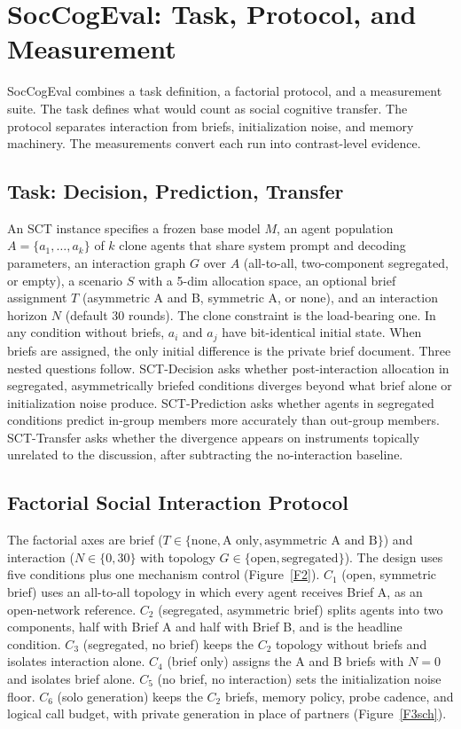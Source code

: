 \section{SocCogEval: Task, Protocol, and Measurement}\label{sec:method}\label{sec:task}

SocCogEval combines a task definition, a factorial protocol, and a measurement suite. The task defines what would count as social cognitive transfer. The protocol separates interaction from briefs, initialization noise, and memory machinery. The measurements convert each run into contrast-level evidence.

\subsection{Task: Decision, Prediction, Transfer}\label{sec:sct-task}

An SCT instance specifies a frozen base model $M$, an agent population $A{=}\{a_1, \dots, a_k\}$ of $k$ clone agents that share system prompt and decoding parameters, an interaction graph $G$ over $A$ (all-to-all, two-component segregated, or empty), a scenario $S$ with a 5-dim allocation space, an optional brief assignment $T$ (asymmetric A and B, symmetric A, or none), and an interaction horizon $N$ (default 30 rounds). The clone constraint is the load-bearing one. In any condition without briefs, $a_i$ and $a_j$ have bit-identical initial state. When briefs are assigned, the only initial difference is the private brief document. Three nested questions follow. SCT-Decision asks whether post-interaction allocation in segregated, asymmetrically briefed conditions diverges beyond what brief alone or initialization noise produce. SCT-Prediction asks whether agents in segregated conditions predict in-group members more accurately than out-group members. SCT-Transfer asks whether the divergence appears on instruments topically unrelated to the discussion, after subtracting the no-interaction baseline.

\subsection{Factorial Social Interaction Protocol}\label{sec:fsip}

The factorial axes are brief ($T \in \{\text{none}, \text{A only}, \text{asymmetric A and B}\}$) and interaction ($N \in \{0, 30\}$ with topology $G \in \{\text{open}, \text{segregated}\}$). The design uses five conditions plus one mechanism control (Figure~\ref{F2}). $C_1$ (open, symmetric brief) uses an all-to-all topology in which every agent receives Brief A, as an open-network reference. $C_2$ (segregated, asymmetric brief) splits agents into two components, half with Brief A and half with Brief B, and is the headline condition. $C_3$ (segregated, no brief) keeps the $C_2$ topology without briefs and isolates interaction alone. $C_4$ (brief only) assigns the A and B briefs with $N{=}0$ and isolates brief alone. $C_5$ (no brief, no interaction) sets the initialization noise floor. $C_6$ (solo generation) keeps the $C_2$ briefs, memory policy, probe cadence, and logical call budget, with private generation in place of partners (Figure~\ref{F3sch}).

